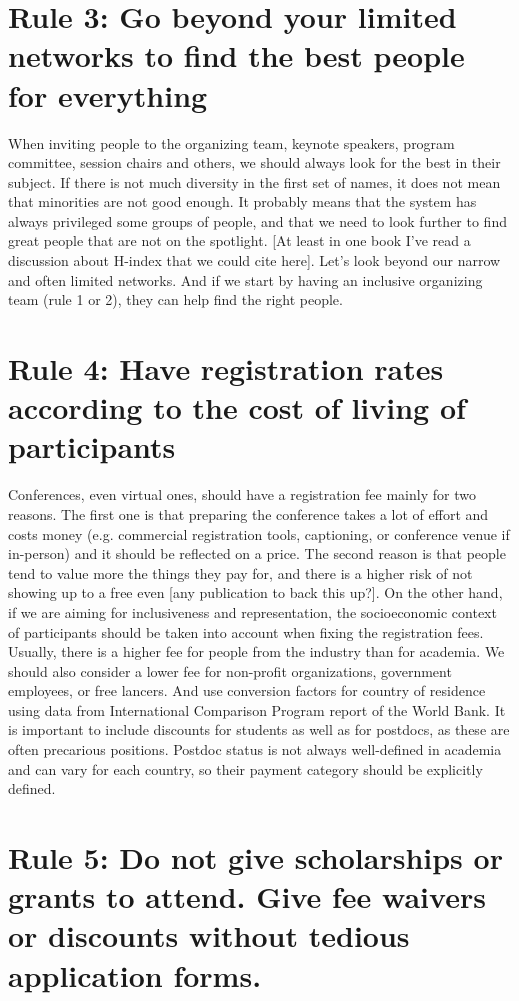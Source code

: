 \documentclass[10pt,letterpaper]{article}
\begin{document}
\section*{Rule 3: Go beyond your limited networks to find the best people for everything}

When inviting people to the organizing team, keynote speakers, program committee, session chairs and others, we should always look for the best in their subject. If there is not much diversity in the first set of names, it does not mean that minorities are not good enough. It probably means that the system has always privileged some groups of people, and that we need to look further to find great people that are not on the spotlight. [At least in one book I've read a discussion about H-index that we could cite here]. Let's look beyond our narrow and often limited networks. And if we start by having an inclusive organizing team (rule 1 or 2), they can help find the right people. 


\section*{Rule 4: Have registration rates according to the cost of living of participants}

Conferences, even virtual ones, should have a registration fee mainly for two reasons. The first one is that preparing the conference takes a lot of effort and costs money (e.g. commercial registration tools, captioning, or conference venue if in-person) and it should be reflected on a price. The second reason is that people tend to value more the things they pay for, and there is a higher risk of not showing up to a free even [any publication to back this up?]. On the other hand, if we are aiming for inclusiveness and representation, the socioeconomic context of participants should be taken into account when fixing the registration fees. Usually, there is a higher fee for people from the industry than for academia. We should also consider a lower fee for non-profit organizations, government employees, or free lancers. And use conversion factors for country of residence using data from International Comparison Program report of the World Bank. It is important to include discounts for students as well as for postdocs, as these are often precarious positions. Postdoc status is not always well-defined in academia and can vary for each country, so their payment category should be explicitly defined. 


\section*{Rule 5: Do not give scholarships or grants to attend. Give fee waivers or discounts without tedious application forms.}
\end{document}
